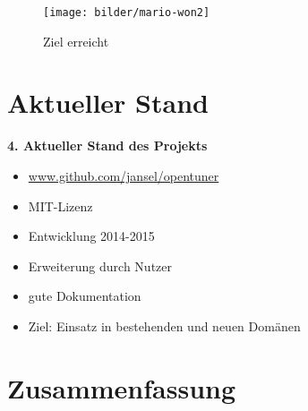  \begingroup
  \begin{frame}
  
    \begin{figure}
    \centering\texttt{[image: bilder/mario-won2]}
    \caption{Ziel erreicht}
  \end{figure}
  
  \centering{}
  
  \end{frame}  
  \endgroup
  
  \section{Aktueller Stand}
  \begingroup
  \begin{frame}
  
  \textbf{4. Aktueller Stand des Projekts}
  
  \begin{itemize}
    \item \url{www.github.com/jansel/opentuner}
    \item MIT-Lizenz
    \item Entwicklung 2014-2015
    \item Erweiterung durch Nutzer
    \item gute Dokumentation
    \item Ziel: Einsatz in bestehenden und neuen Domänen
  \end{itemize}
  
  
  
  \end{frame}  
  \endgroup
    
  \section{Zusammenfassung}
  
